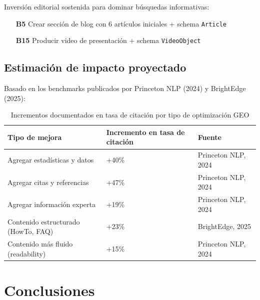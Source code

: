 \documentclass[12pt, a4paper]{article}
\begin{document}
\begin{tcolorbox}[colback=azul!7, colframe=azul, title={\faRocket\ Fase 3 — Estrategia de contenido a largo plazo (6+ semanas)}, fonttitle=\bfseries, breakable]
Inversión editorial sostenida para dominar búsquedas informativas:
\begin{enumerate}[itemsep=4pt]
  \item[\textbf{B5}] Crear sección de blog con 6 artículos iniciales + schema \texttt{Article}
  \item[\textbf{B15}] Producir video de presentación + schema \texttt{VideoObject}
\end{enumerate}
\end{tcolorbox}

\subsection{Estimación de impacto proyectado}

Basado en los benchmarks publicados por Princeton NLP (2024) y BrightEdge (2025):

\begin{table}[H]
\centering
{}
\begin{tabularx}{\textwidth}{L{5cm} C{3cm} C{4cm}}
  \toprule
  \textbf{Tipo de mejora} & \textbf{Incremento en tasa de citación} & \textbf{Fuente} \\
  \midrule
  Agregar estadísticas y datos & +40\% & Princeton NLP, 2024 \\
  Agregar citas y referencias & +47\% & Princeton NLP, 2024 \\
  Agregar información experta & +19\% & Princeton NLP, 2024 \\
  Contenido estructurado (HowTo, FAQ) & +23\% & BrightEdge, 2025 \\
  Contenido más fluido (readability) & +15\% & Princeton NLP, 2024 \\
  \bottomrule
\end{tabularx}
\caption{Incrementos documentados en tasa de citación por tipo de optimización GEO}
\end{table}

\newpage

\section{Conclusiones}
\end{document}
